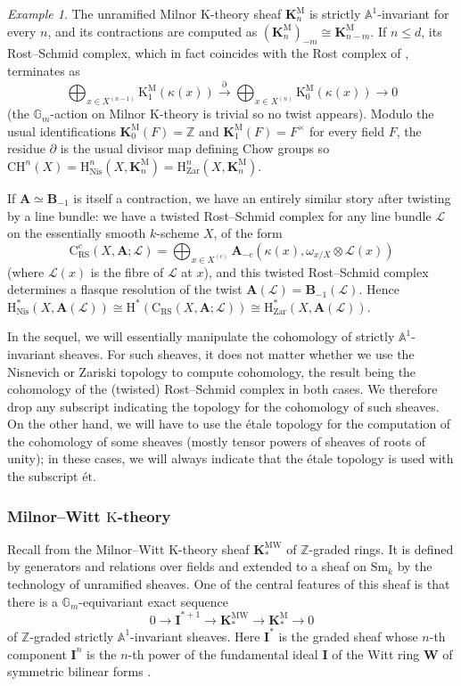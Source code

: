 \documentclass[11pt,leqno]{amsart}
\renewcommand{\1}{{\rm 1\hspace*{-0.4ex}%
\rule{0.1ex}{1.52ex}\hspace*{0.2ex}}}
\newcommand{\gm}[1]{{{\mathbb G}_{m}^{#1}}}
\newcommand{\Gm}{{\gm{}}}
\renewcommand{\Lc}{{\mathcal L}}
\newcommand{\et}{\text{\'et}}
\newcommand{\Nis}{{\operatorname{Nis}}}
\newcommand{\Zar}{\operatorname{Zar}} %
\newcommand{\CH}{{\mathrm{CH}}}
\newcommand{\Sm}{\mathrm{Sm}}
\newcommand{\Hr}{{\mathrm {H}}}
\newcommand{\<}[1]{{\langle}#1 {\rangle}}
\newcommand{\Ibf}{\mathbf{I}}
\newcommand{\Kr}{\mathrm{K}}
\newcommand{\Abf}{\mathbf{A}}
\newcommand{\Cr}{\mathrm{C}}
\newcommand{\RS}{\mathrm{RS}}
\newcommand{\Zb}{\mathbb{Z}}
\newcommand{\Bbf}{\mathbf{B}}
\newcommand{\Kbf}{\mathbf{K}}
\newcommand{\Abb}{\mathbb{A}}
\newcommand{\Mr}{\mathrm{M}}
\newcommand{\MW}{\mathrm{MW}}
\theoremstyle{plain}
\theoremstyle{definition}
\theoremstyle{remark}
\newtheorem{ex}[thm]{Example}
\numberwithin{equation}{section}
\begin{document}
\begin{ex}
The unramified Milnor $\Kr$-theory sheaf $\Kbf_n^\Mr$ is strictly $\Abb^1$-invariant for every $n$, and its contractions are computed as $(\Kbf_n^\Mr)_{-m}\cong\Kbf_{n-m}^\Mr$. If $n\leq d$, its Rost--Schmid complex, which in fact coincides with the Rost complex of \cite{rostChowGroupsCoefficients1996}, terminates as \[\bigoplus_{x\in X^{(n-1)}}\Kr_1^\Mr(\kappa(x))\xrightarrow{\partial}\bigoplus_{x\in X^{(n)}}\Kr_0^\Mr(\kappa(x))\rightarrow 0\] (the $\mathbb{G}_m$-action on Milnor $\Kr$-theory is trivial so no twist appears). Modulo the usual identifications $\Kbf_0^\Mr(F)=\Zb$ and $\Kbf_1^\Mr(F)=F^\times$ for every field $F$, the residue $\partial$ is the usual divisor map defining Chow groups so $\CH^n(X)=\Hr_{\Nis}^n(X,\Kbf_n^\Mr)=\Hr_{\Zar}^n(X,\Kbf_n^\Mr)$.
\end{ex}

If $\Abf\simeq\Bbf_{-1}$ is itself a contraction, we have an entirely similar story after twisting by a line bundle: we have a twisted Rost--Schmid complex for any line bundle $\Lc$ on the essentially smooth $k$-scheme $X$, of the form \[\Cr_\RS^c(X,\Abf;\Lc)=\bigoplus_{x\in X^{(c)}}\Abf_{-c}(\kappa(x),\omega_{x/X}\otimes\Lc(x))\] (where $\Lc(x)$ is the fibre of $\Lc$ at $x$), and this twisted Rost--Schmid complex determines a flasque resolution of the twist $\Abf(\Lc)=\Bbf_{-1}(\Lc)$. Hence $\Hr_{\Nis}^*(X,\Abf(\Lc))\cong\Hr^*(\Cr_\RS(X,\Abf;\Lc))\cong\Hr_{\Zar}^*(X,\Abf(\Lc))$.

In the sequel, we will essentially manipulate the cohomology of strictly $\Abb^1$-invariant sheaves. For such sheaves, it does not matter whether we use the Nisnevich or Zariski topology to compute cohomology, the result being the cohomology of the (twisted) Rost--Schmid complex in both cases. We therefore drop any subscript indicating the topology for the cohomology of such sheaves. On the other hand, we will have to use the étale topology for the computation of the cohomology of some sheaves (mostly tensor powers of sheaves of roots of unity); in these cases, we will always indicate that the étale topology is used with the subscript $\et$.

\subsubsection*{Milnor--Witt $\Kr$-theory}

Recall from \cite[Chapter 3]{morelA1AlgebraicTopologyField2012} the Milnor--Witt $\Kr$-theory sheaf $\Kbf_*^\MW$ of $\Zb$-graded rings. It is defined by generators and relations over fields and extended to a sheaf on $\Sm_k$ by the technology of unramified sheaves. One of the central features of this sheaf is that there is a $\Gm$-equivariant exact sequence 
\begin{equation}\label{eq:exact_sequence_mw_ktheory}
0\to\Ibf^{*+1}\to\Kbf_*^\MW\to\Kbf_*^\Mr\to 0
\end{equation}
of $\Zb$-graded strictly $\Abb^1$-invariant sheaves. Here $\Ibf^*$ is the graded sheaf whose $n$-th component $\Ibf^n$ is the $n$-th power of the fundamental ideal $\Ibf$ of the Witt ring $\mathbf{W}$ of symmetric bilinear forms \cite[Example 3.34]{morelA1AlgebraicTopologyField2012}.
\end{document}
